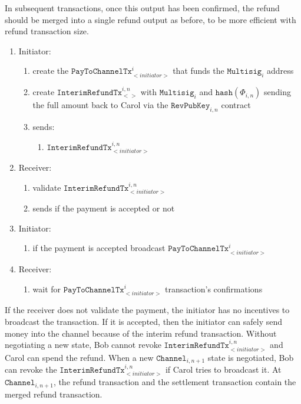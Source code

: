 \documentclass{llncs}
\begin{document}
In subsequent transactions, once this output has been confirmed, the refund
should be merged into a single refund output as before, to be more efficient
with refund transaction size.

\begin{enumerate}
\item Initiator:
  \begin{enumerate}
  \item create the $\texttt{PayToChannelTx}_{<initiator>}^{i}$ that funds the
$\texttt{Multisig}_{i}$ address
  \item create $\texttt{InterimRefundTx}_{<>}^{i,n}$ with
$\texttt{Multisig}_{i}$ and $\texttt{hash}(\Phi_{i,n})$ sending the full amount
back to Carol via the $\texttt{RevPubKey}_{i,n}$ contract
  \item sends:
    \begin{enumerate}
    \item $\texttt{InterimRefundTx}_{<initiator>}^{i,n}$
    \end{enumerate}
  \end{enumerate}
\item Receiver:
  \begin{enumerate}
  \item validate $\texttt{InterimRefundTx}_{<initiator>}^{i,n}$
  \item sends if the payment is accepted or not
  \end{enumerate}
\item Initiator:
  \begin{enumerate}
  \item if the payment is accepted broadcast
$\texttt{PayToChannelTx}_{<initiator>}^{i}$
  \end{enumerate}
\item Receiver:
  \begin{enumerate}
  \item wait for $\texttt{PayToChannelTx}_{<initiator>}^{i}$ transaction's
confirmations
  \end{enumerate}
\end{enumerate}

If the receiver does not validate the payment, the initiator has no incentives
to broadcast the transaction. If it is accepted, then the initiator can safely
send money into the channel because of the interim refund transaction. Without
negotiating a new state, Bob cannot revoke
$\texttt{InterimRefundTx}_{<initiator>}^{i,n}$ and Carol can spend the refund.
When a new $\texttt{Channel}_{i,n+1}$ state is negotiated, Bob can revoke the
$\texttt{InterimRefundTx}_{<initiator>}^{i,n}$ if Carol tries to broadcast it.
At $\texttt{Channel}_{i,n+1}$, the refund transaction and the settlement
transaction contain the merged refund transaction.
\end{document}
